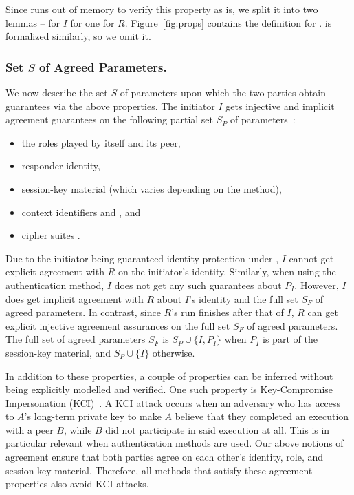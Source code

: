 \documentclass[runningheads]{llncs}
\begin{document}
Since \mTamarin{} runs out of memory to verify this property as is,
we split it into two lemmas -- \mPredImpI{} for $I$ for one \mPredImpR{} for 
$R$.
%
Figure~\ref{fig:props} contains the definition for \mPredImpI{}.
%
\mPredImpR{} is formalized similarly, so we omit it.
%

\subsubsection{Set $S$ of Agreed Parameters.}
\label{sec:agreedParams}
We now describe the set $S$ of parameters upon which the two parties obtain
guarantees via the above properties.
%
The initiator $I$ gets injective and implicit agreement guarantees on the
following partial set $S_P$ of parameters~\cite{Norr21}:
\begin{itemize}
    \item the roles played by itself and its peer,
    \item responder identity,
    \item session-key material (which varies depending on the \mEdhoc{} 
method),
    \item context identifiers \mCi{} and \mCr{}, and
    \item cipher suites \mSuites{}.
\end{itemize}
%

Due to the initiator being guaranteed identity protection under \mEdhoc{}, $I$
cannot get explicit agreement with $R$ on the initiator's identity.
%
Similarly, when using the \mStat{} authentication method, $I$ does not get 
any
such guarantees about $P_{I}$.
%
However, $I$ does get implicit agreement with $R$ about $I$'s identity and the
full set $S_{F}$ of agreed parameters.
%
In contrast, since $R$'s run finishes after that of $I$, $R$ can get explicit
injective agreement assurances on the full set $S_{F}$ of agreed parameters.
%
The full set of agreed parameters $S_F$ is $S_P \cup \{I, P_I\}$ when $P_I$
is part of the session-key material, and $S_P \cup \{I\}$ otherwise.
%

In addition to these properties, a couple of properties can be inferred
without being explicitly modelled and verified.
%
One such property is Key-Compromise Impersonation
(KCI)~\cite{DBLP:conf/ima/Blake-WilsonJM97}.
%
A KCI attack occurs when an adversary who has access to $A$'s long-term 
private
key to make $A$ believe that they completed an execution with a peer $B$,
while $B$ did not participate in said execution at all.
%
This is in particular relevant when \mStat{} authentication methods are used.
%
Our above notions of agreement ensure that both parties agree on each
other's identity, role, and session-key material.
%
Therefore, all \mEdhoc{} methods that satisfy these agreement properties also
avoid KCI attacks.
%
\end{document}
